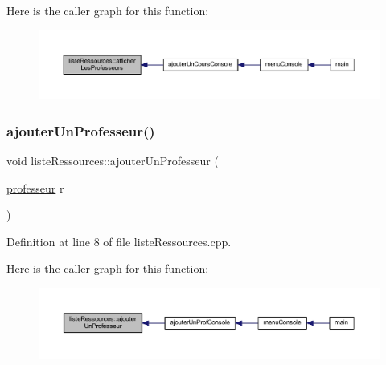 Here is the caller graph for this function\+:\nopagebreak
\begin{figure}[H]
\begin{center}
\leavevmode
\includegraphics[width=350pt]{classliste_ressources_a8459ff3010ad07d1ec5b23d73fad6911_icgraph}
\end{center}
\end{figure}
\hypertarget{classliste_ressources_afb8d1bb96971684ed945622b462fcd5d}{}\label{classliste_ressources_afb8d1bb96971684ed945622b462fcd5d} 
\subsubsection{\texorpdfstring{ajouter\+Un\+Professeur()}{ajouterUnProfesseur()}}
{\footnotesize\ttfamily void liste\+Ressources\+::ajouter\+Un\+Professeur (\begin{DoxyParamCaption}\item[{\hyperlink{classprofesseur}{professeur}}]{r }\end{DoxyParamCaption})}



Definition at line 8 of file liste\+Ressources.\+cpp.

Here is the caller graph for this function\+:\nopagebreak
\begin{figure}[H]
\begin{center}
\leavevmode
\includegraphics[width=350pt]{classliste_ressources_afb8d1bb96971684ed945622b462fcd5d_icgraph}
\end{center}
\end{figure}
\hypertarget{classliste_ressources_a9b496a36a9651347734d7895397dde00}{}\label{classliste_ressources_a9b496a36a9651347734d7895397dde00} 
